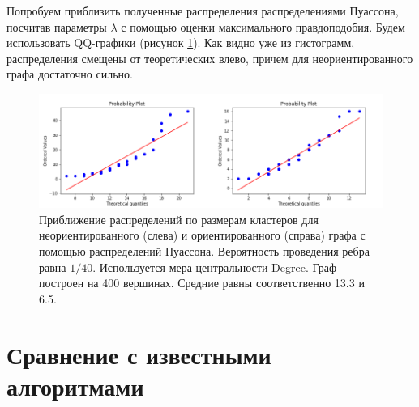 Попробуем приблизить полученные распределения распределениями Пуассона, посчитав параметры $\lambda$ с помощью оценки максимального правдоподобия. Будем использовать QQ-графики (рисунок \ref{fig:qqs}). Как видно уже из гистограмм, распределения смещены от теоретических влево, причем для неориентированного графа достаточно сильно.

\begin{figure}[h!]
	\centering
	\includegraphics[width=\textwidth]{pics/qqs.png}
	\caption{Приближение распределений по размерам кластеров для неориентированного (слева) и ориентированного (справа) графа с помощью распределений Пуассона. Вероятность проведения ребра равна $1/40$. Используется мера центральности Degree. Граф построен на 400 вершинах. Средние равны соответственно 13.3 и 6.5.} 
	\label{fig:qqs}
\end{figure}

\section{Сравнение с известными алгоритмами}
